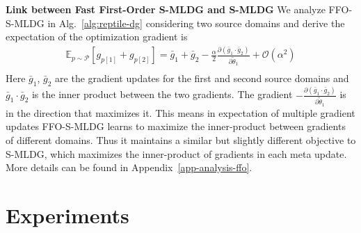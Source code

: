 \documentclass[runningheads]{llncs}
\newcommand{\nameS}{S-MLDG}
\newcommand{\nameFFS}{FFO-\nameS}
\newcommand{\keypoint}[1]{\vspace{0.1cm}\noindent\textbf{#1}\quad}
\begin{document}
\keypoint{Link between Fast First-Order \nameS{} and \nameS{}}
We analyze \nameFFS{} in Alg.~\ref{alg:reptile-dg} considering two source domains and derive the expectation of the optimization gradient is 
\small
\begin{equation}
\label{eq:ffo-hmldg-expectation-two-loss}
\begin{aligned}
 \mathbb{E}_{p\sim\mathcal{P}}[g_{p[1]}+g_{p[2]}] = \bar{g}_1 + \bar{g}_2 - \frac{\alpha}{2} \frac{\partial (\bar{g}_1 \cdot \bar{g}_2)}{\partial \tilde{\theta}_1} + \mathcal{O}(\alpha^2)\\
\end{aligned}
\end{equation}
\normalsize
Here $\bar{g}_1$, $\bar{g}_2$ are the gradient updates for the first and second source domains and $\bar{g}_1 \cdot \bar{g}_2$ is the inner product between the two gradients. The gradient $ - \frac{\partial (\bar{g}_1 \cdot \bar{g}_2)}{\partial \tilde{\theta}_1}$ is in the direction that maximizes it. This means in expectation of multiple gradient updates \nameFFS{} learns to maximize the inner-product between gradients of different domains. Thus it maintains a similar but slightly different objective to \nameS{}, which maximizes the inner-product of gradients in each meta update. More details can be found in Appendix~\ref{app-analysis-ffo}.


















\section{Experiments}
\end{document}
